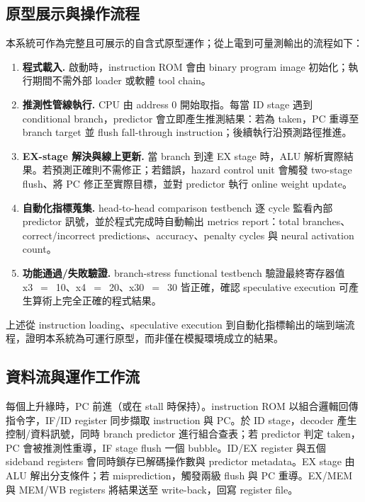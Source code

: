 \documentclass[12pt,a4paper]{article}
\begin{document}
	\subsection{原型展示與操作流程}
	\label{sec:demo}

	本系統可作為完整且可展示的自含式原型運作；從上電到可量測輸出的流程如下：

	\begin{enumerate}
		\item \textbf{程式載入.} 啟動時，instruction ROM 會由 binary program image 初始化；執行期間不需外部 loader 或軟體 tool chain。

		\item \textbf{推測性管線執行.} CPU 由 address 0 開始取指。每當 ID stage 遇到 conditional branch，predictor 會立即產生推測結果：若為 taken，PC 重導至 branch target 並 flush fall-through instruction；後續執行沿預測路徑推進。

		\item \textbf{EX-stage 解決與線上更新.} 當 branch 到達 EX stage 時，ALU 解析實際結果。若預測正確則不需修正；若錯誤，hazard control unit 會觸發 two-stage flush、將 PC 修正至實際目標，並對 predictor 執行 online weight update。

		\item \textbf{自動化指標蒐集.} head-to-head comparison testbench 逐 cycle 監看內部 predictor 訊號，並於程式完成時自動輸出 metrics report：total branches、correct/incorrect predictions、accuracy、penalty cycles 與 neural activation count。

		\item \textbf{功能通過/失敗驗證.} branch-stress functional testbench 驗證最終寄存器值 x3~$=$~10、x4~$=$~20、x30~$=$~30 皆正確，確認 speculative execution 可產生算術上完全正確的程式結果。
	\end{enumerate}

	上述從 instruction loading、speculative execution 到自動化指標輸出的端到端流程，證明本系統為可運行原型，而非僅在模擬環境成立的結果。

	\subsection{資料流與運作工作流}
	\label{sec:dataflow}

	每個上升緣時，PC 前進（或在 stall 時保持）。instruction ROM 以組合邏輯回傳指令字，IF/ID register 同步擷取 instruction 與 PC。於 ID stage，decoder 產生控制/資料訊號，同時 branch predictor 進行組合查表；若 predictor 判定 taken，PC 會被推測性重導，IF stage flush 一個 bubble。ID/EX register 與五個 sideband registers 會同時鎖存已解碼操作數與 predictor metadata。EX stage 由 ALU 解出分支條件；若 misprediction，觸發兩級 flush 與 PC 重導。EX/MEM 與 MEM/WB registers 將結果送至 write-back，回寫 register file。
\end{document}
